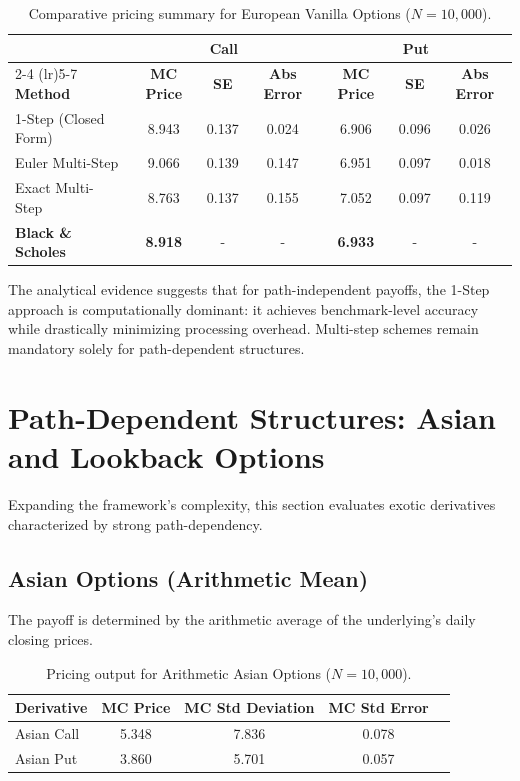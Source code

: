 \documentclass{report}
\begin{document}
\begin{table}[htbp]
    \centering
    \begin{tabular}{lcccccc}
        \toprule
        & \multicolumn{3}{c}{\textbf{Call}} & \multicolumn{3}{c}{\textbf{Put}} \\
        \cmidrule(lr){2-4} \cmidrule(lr){5-7}
        \textbf{Method} & \textbf{MC Price} & \textbf{SE} & \textbf{Abs Error} & \textbf{MC Price} & \textbf{SE} & \textbf{Abs Error} \\
        \midrule
        1-Step (Closed Form) & 8.943 & 0.137 & 0.024 & 6.906 & 0.096 & 0.026 \\
        Euler Multi-Step & 9.066 & 0.139 & 0.147 & 6.951 & 0.097 & 0.018 \\
        Exact Multi-Step & 8.763 & 0.137 & 0.155 & 7.052 & 0.097 & 0.119 \\
        \midrule
        \textbf{Black \& Scholes} & \textbf{8.918} & - & - & \textbf{6.933} & - & - \\
        \bottomrule
    \end{tabular}
    \caption{Comparative pricing summary for European Vanilla Options ($N=10{,}000$).}
    \label{tab:vanilla_comparison}
\end{table}

The analytical evidence suggests that for path-independent payoffs, the 1-Step approach is computationally dominant: it achieves benchmark-level accuracy while drastically minimizing processing overhead. Multi-step schemes remain mandatory solely for path-dependent structures.

\section{Path-Dependent Structures: Asian and Lookback Options}
Expanding the framework's complexity, this section evaluates exotic derivatives characterized by strong path-dependency.

\subsection{Asian Options (Arithmetic Mean)}
The payoff is determined by the arithmetic average of the underlying's daily closing prices. 

\begin{table}[htbp]
    \centering
    \begin{tabular}{lcccc}
        \toprule
        \textbf{Derivative} & \textbf{MC Price} & \textbf{MC Std Deviation} & \textbf{MC Std Error} \\
        \midrule
        Asian Call & 5.348 & 7.836 & 0.078 \\
        Asian Put & 3.860 & 5.701 & 0.057 \\
        \bottomrule
    \end{tabular}
    \caption{Pricing output for Arithmetic Asian Options ($N=10{,}000$).}
    \label{tab:asian}
\end{table}
\end{document}
